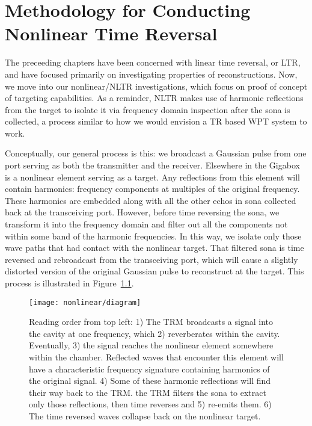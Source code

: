 \chapter{Methodology for Conducting Nonlinear Time Reversal}
\label{ch:nonlinear-meth}

The preceeding chapters have been concerned with linear time reversal, or LTR, and have focused primarily on investigating properties of reconstructions. Now, we move into our nonlinear/NLTR investigations, which focus on proof of concept of targeting capabilities. As a reminder, NLTR makes use of harmonic reflections from the target to isolate it via frequency domain inspection after the sona is collected, a process similar to how we would envision a TR based WPT system to work. 

Conceptually, our general process is this: we broadcast a Gaussian pulse from one port serving as both the transmitter and the receiver. Elsewhere in the Gigabox is a nonlinear element serving as a target. Any reflections from this element will contain harmonics: frequency components at multiples of the original frequency. These harmonics are embedded along with all the other echos in sona collected back at the transceiving port. However, before time reversing the sona, we transform it into the frequency domain and filter out all the components not within some band of the harmonic frequencies. In this way, we isolate only those wave paths that had contact with the nonlinear target. That filtered sona is time reversed and rebroadcast from the transceiving port, which will cause a slightly distorted version of the original Gaussian pulse to reconstruct at the target. This process is illustrated in Figure~\ref{fig:nonlinear-diagram}.

\begin{figure}[h!]
\centering
\texttt{[image: nonlinear/diagram]}
    \caption[Demonstration of nonlinear time reversal]{Reading order from top left: 1) The TRM broadcasts a signal into the cavity at one frequency, which 2) reverberates within the cavity. Eventually, 3) the signal reaches the nonlinear element somewhere within the chamber. Reflected waves that encounter this element will have a characteristic frequency signature containing harmonics of the original signal. 4) Some of these harmonic reflections will find their way back to the TRM. the TRM filters the sona to extract only those reflections, then time reverses and 5) re-emits them. 6) The time reversed waves collapse back on the nonlinear target.}
    \label{fig:nonlinear-diagram}
\end{figure}
